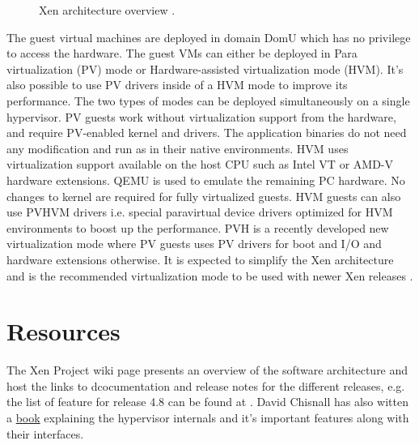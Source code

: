 \documentclass[9pt,twocolumn,twoside]{../../styles/osajnl}
\begin{document}
\begin{figure}[htbp]
	\centering
	\caption{Xen architecture overview \cite{www-xen-arch-diag}.}
	\label{fig:xen-arch}
\end{figure}

The guest virtual machines are deployed in domain DomU which has no privilege to access the hardware. The guest VMs can either be deployed in Para virtualization (PV) mode or Hardware-assisted virtualization mode (HVM). It's also possible to use PV drivers inside of a HVM mode to improve its performance. The two types of modes can be deployed simultaneously  on a single hypervisor. PV guests work without virtualization support from the hardware, and require PV-enabled kernel and drivers. The application binaries do not need any modification and run as in their native environments.  HVM uses virtualization support available on the host CPU such as Intel VT or AMD-V hardware extensions. QEMU is used to emulate the remaining PC hardware. No changes to kernel are required for fully virtualized guests. HVM guests can also use PVHVM drivers i.e. special  paravirtual device drivers optimized for HVM environments to boost up the performance. PVH is a recently developed new virtualization mode where  PV guests uses PV drivers for boot and I/O and hardware extensions otherwise. It is expected to simplify the Xen architecture and is the recommended virtualization mode to be used with newer Xen releases \cite{www-xen-pvh}. 

\section{Resources}

The Xen Project wiki page presents an overview of the software architecture and host the links to dcocumentation and release notes for the different releases, e.g. the list of feature for release 4.8 can be found at \cite{www-xen-4.8-release-note}. David Chisnall has also witten a \href{http://www.informit.com/store/definitive-guide-to-the-xen-hypervisor-9780133582499} {book} explaining the hypervisor internals and it's important features along with their interfaces. 
\end{document}
